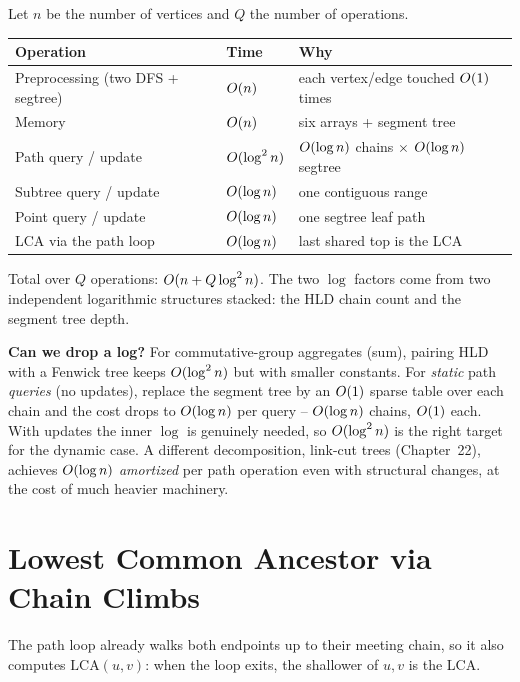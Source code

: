 \begin{complexitybox}
Let $n$ be the number of vertices and $Q$ the number of operations.
\begin{center}
\begin{tabular}{lll}
\toprule
Operation & Time & Why \\
\midrule
Preprocessing (two DFS + segtree) & $O(n)$ & each vertex/edge touched $O(1)$ times\\
Memory & $O(n)$ & six arrays + segment tree\\
Path query / update & $O(\log^2 n)$ & $O(\log n)$ chains $\times$ $O(\log n)$ segtree\\
Subtree query / update & $O(\log n)$ & one contiguous range\\
Point query / update & $O(\log n)$ & one segtree leaf path\\
LCA via the path loop & $O(\log n)$ & last shared top is the LCA\\
\bottomrule
\end{tabular}
\end{center}
Total over $Q$ operations: $O(n + Q\log^2 n)$. The two $\log$ factors come from two independent
logarithmic structures stacked: the HLD chain count and the segment tree depth.
\end{complexitybox}

\begin{whybox}
\textbf{Can we drop a log?} For commutative-group aggregates (sum), pairing HLD with a Fenwick tree
keeps $O(\log^2 n)$ but with smaller constants. For \emph{static} path \emph{queries} (no updates),
replace the segment tree by an $O(1)$ sparse table over each chain and the cost drops to
$O(\log n)$ per query -- $O(\log n)$ chains, $O(1)$ each. With updates the inner $\log$ is
genuinely needed, so $O(\log^2 n)$ is the right target for the dynamic case. A different
decomposition, link-cut trees (Chapter~22), achieves $O(\log n)$ \emph{amortized} per path operation
even with structural changes, at the cost of much heavier machinery.
\end{whybox}

\section{Lowest Common Ancestor via Chain Climbs}
\label{ch19:lca}

The path loop already walks both endpoints up to their meeting chain, so it also computes
$\mathrm{LCA}(u,v)$: when the loop exits, the shallower of $u,v$ is the LCA.

